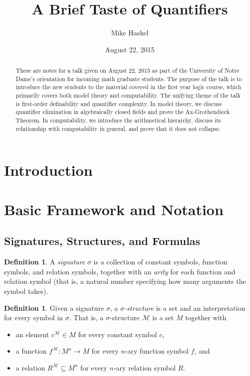 \documentclass{article}
\title{A Brief Taste of Quantifiers}
\author{Mike Haskel}
\date{August 22, 2015}
\theoremstyle{plain}
\theoremstyle{definition}
\newtheorem{defn}[thm]{Definition}
\newcommand{\defterm}{\emph}
\begin{document}
\maketitle

\begin{abstract}
  These are notes for a talk given on August 22, 2015 as part of the
  University of Notre Dame's orientation for incoming math graduate
  students. The purpose of the talk is to introduce the new students
  to the material covered in the first year logic course, which
  primarily covers both model theory and computability. The unifying
  theme of the talk is first-order definability and quantifier
  complexity. In model theory, we discuss quantifier elimination in
  algebraically closed fields and prove the Ax-Grothendieck
  Theorem. In computability, we introduce the arithmetical hierarchy,
  discuss its relationship with computability in general, and prove
  that it does not collapse.
\end{abstract}

\section{Introduction}

\section{Basic Framework and Notation}

\subsection{Signatures, Structures, and Formulas}

\begin{defn}
  A \defterm{signature} $\sigma$ is a collection of constant symbols,
  function symbols, and relation symbols, together with an
  \defterm{arity} for each function and relation symbol (that is, a
  natural number specifying how many arguments the symbol takes).
\end{defn}

\begin{defn}
  Given a signature $\sigma$, a \defterm{$\sigma$-structure} is a set
  and an interpretation for every symbol in $\sigma$. That is, a
  $\sigma$-structure $\mathcal{M}$ is a set $M$ together with
  \begin{itemize}
  \item an element $c^\mathcal{M} \in M$ for every constant symbol $c$,
  \item a function $f^\mathcal{M} : M^n \to M$ for every $n$-ary function symbol $f$, and
  \item a relation $R^\mathcal{M} \subseteq M^n$ for every $n$-ary relation symbol $R$.
  \end{itemize}
\end{defn}
\end{document}
